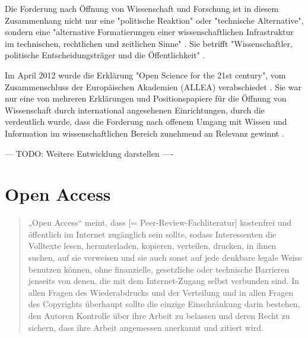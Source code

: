 Die Forderung nach Öffnung von Wissenschaft und Forschung ist in diesem Zusammenhang nicht nur eine "politische Reaktion" oder "technische Alternative", sondern eine "alternative Formatierungen einer wissenschaftlichen Infrastruktur im technischen, rechtlichen und zeitlichen Sinne" \cite{kelty_2004}. Sie betrifft "Wissenschaftler, politische Entscheidungsträger und die Öffentlichkeit" \cite{Scheliga_2014}.

Im April 2012 wurde die Erklärung "Open Science for the 21st century", vom Zusammenschluss der Europäischen Akademien (ALLEA) verabschiedet \cite{ALLEA_2012}. Sie war nur eine von mehreren Erklärungen und Positionspapiere für die Öffnung von Wissenschaft durch international angesehenen Einrichtungen, durch die verdeutlich wurde, dass die Forderung nach offenem Umgang mit Wissen und Information im wissenschaftlichen Bereich zunehmend an Relevanz gewinnt \cite{schulze_2013_open}.

--- TODO: Weitere Entwicklung darstellen ----

\section{Open Access}

\begin{quote}
„Open Access“ meint, dass [= Peer-Review-Fachliteratur] kostenfrei und öffentlich im Internet zugänglich sein sollte, sodass Interessenten die Volltexte lesen, herunterladen, kopieren, verteilen, drucken, in ihnen suchen, auf sie verweisen und sie auch sonst auf jede denkbare legale Weise benutzen können, ohne finanzielle, gesetzliche oder technische Barrieren jenseits von denen, die mit dem Internet-Zugang selbst verbunden sind. In allen Fragen des Wiederabdrucks und der Verteilung und in allen Fragen des Copyrights überhaupt sollte die einzige Einschränkung darin bestehen, den Autoren Kontrolle über ihre Arbeit zu belassen und deren Recht zu sichern, dass ihre Arbeit angemessen anerkannt und zitiert wird.
\cite{boai_2012}
\end{quote}

